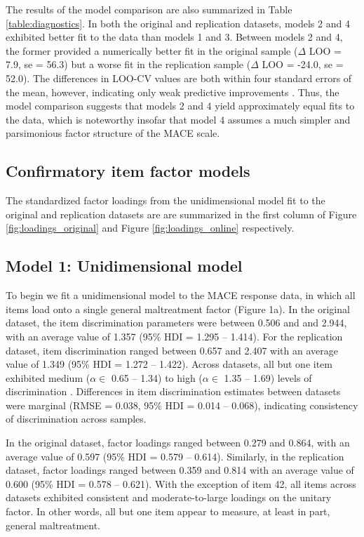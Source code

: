 \documentclass[letterpaper,man,natbib]{apa6}  %
\begin{document}
The results of the model comparison are also summarized in Table \ref{table:diagnostics}. In both the original and replication datasets, models 2 and 4 exhibited better fit to the data than models 1 and 3. Between models 2 and 4, the former provided a numerically better fit in the original sample ($\Delta$ LOO = 7.9, se = 56.3) but a worse fit in the replication sample ($\Delta$ LOO = -24.0, se = 52.0). The differences in LOO-CV values are both within four standard errors of the mean, however, indicating only weak predictive improvements \citep{vehtari2022cv}. Thus, the model comparison suggests that models 2 and 4 yield approximately equal fits to the data, which is noteworthy insofar that model 4 assumes a much simpler and parsimonious factor structure of the MACE scale.

\subsection{Confirmatory item factor models}

The standardized factor loadings from the unidimensional model fit to the original and replication datasets are are summarized in the first column of Figure \ref{fig:loadings_original} and Figure \ref{fig:loadings_online} respectively.

\subsection{Model 1: Unidimensional model}

To begin we fit a unidimensional model to the MACE response data, in which all items load onto a single general maltreatment factor (Figure 1a). In the original dataset, the item discrimination parameters were between 0.506 and and 2.944, with an average value of 1.357 (95\% HDI = 1.295 -- 1.414). For the replication dataset, item discrimination ranged between 0.657 and 2.407 with an average value of  1.349 (95\% HDI = 1.272 -- 1.422). Across datasets, all but one item exhibited medium ($\alpha \in$ 0.65 -- 1.34) to high ($\alpha \in$ 1.35 -- 1.69) levels of discrimination \citep{baker2017basics}. Differences in item discrimination estimates between datasets were marginal (RMSE = 0.038, 95\% HDI = 0.014 -- 0.068), indicating consistency of discrimination across samples. 

In the original dataset, factor loadings ranged between 0.279 and 0.864, with an average value of 0.597 (95\% HDI = 0.579 -- 0.614). Similarly, in the replication dataset, factor loadings ranged between 0.359 and 0.814 with an average value of 0.600 (95\% HDI = 0.578 -- 0.621). With the exception of item 42, all items across datasets exhibited consistent and moderate-to-large loadings on the unitary factor. In other words, all but one item appear to measure, at least in part, general maltreatment. 
\end{document}
